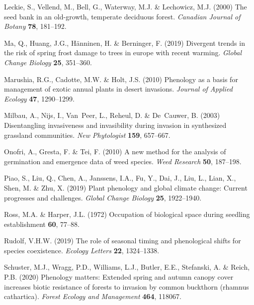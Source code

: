 \documentclass{article}[11pt]
\begin{document}
\begin{thebibliography}{62}
Leckie, S., Vellend, M., Bell, G., Waterway, M.J. \& Lechowicz, M.J. (2000) The
  seed bank in an old-growth, temperate deciduous forest. \emph{Canadian
  Journal of Botany} \textbf{78}, 181--192.

Ma, Q., Huang, J.G., H{\"a}nninen, H. \& Berninger, F. (2019) Divergent trends
  in the risk of spring frost damage to trees in europe with recent warming.
  \emph{Global Change Biology} \textbf{25}, 351--360.

Marushia, R.G., Cadotte, M.W. \& Holt, J.S. (2010) Phenology as a basis for
  management of exotic annual plants in desert invasions. \emph{Journal of
  Applied Ecology} \textbf{47}, 1290--1299.

Milbau, A., Nijs, I., Van~Peer, L., Reheul, D. \& De~Cauwer, B. (2003)
  Disentangling invasiveness and invasibility during invasion in synthesized
  grassland communities. \emph{New Phytologist} \textbf{159}, 657--667.

Onofri, A., Gresta, F. \& Tei, F. (2010) A new method for the analysis of
  germination and emergence data of weed species. \emph{Weed Research}
  \textbf{50}, 187--198.

Piao, S., Liu, Q., Chen, A., Janssens, I.A., Fu, Y., Dai, J., Liu, L., Lian,
  X., Shen, M. \& Zhu, X. (2019) Plant phenology and global climate change:
  Current progresses and challenges. \emph{Global Change Biology} \textbf{25},
  1922--1940.

Ross, M.A. \& Harper, J.L. (1972) Occupation of biological space during
  seedling establishment \textbf{60}, 77--88.

Rudolf, V.H.W. (2019) The role of seasonal timing and phenological shifts for
  species coexistence. \emph{Ecology Letters} \textbf{22}, 1324--1338.

Schuster, M.J., Wragg, P.D., Williams, L.J., Butler, E.E., Stefanski, A. \&
  Reich, P.B. (2020) Phenology matters: Extended spring and autumn canopy cover
  increases biotic resistance of forests to invasion by common buckthorn
  (rhamnus cathartica). \emph{Forest Ecology and Management} \textbf{464},
  118067.


\end{thebibliography}
\end{document}
